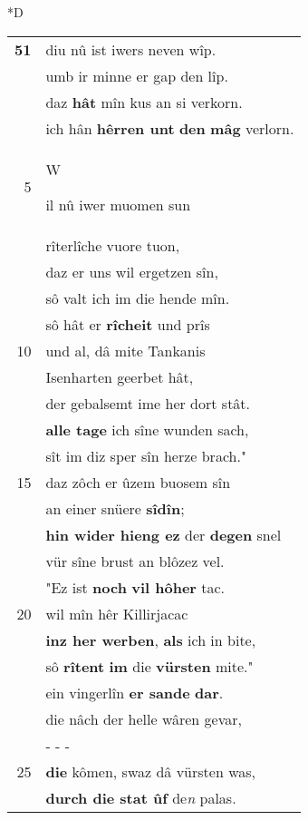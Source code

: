 \documentclass[8pt,a4paper,notitlepage]{article}
\begin{document}
\begin{table}[ht]
\begin{minipage}[t]{0.5\linewidth}
\small
\begin{center}*D
\end{center}
\begin{tabular}{rl}
\textbf{51} & diu nû ist iwers neven wîp.\\ 
 & umb ir minne er gap den lîp.\\ 
 & daz \textbf{hât} mîn kus an si verkorn.\\ 
 & ich hân \textbf{hêrren unt} \textbf{den} \textbf{mâg} verlorn.\\ 
5 & \begin{large}W\end{large}il nû iwer muomen sun\\ 
 & rîterlîche vuore tuon,\\ 
 & daz er uns wil ergetzen sîn,\\ 
 & sô valt ich im die hende mîn.\\ 
 & sô hât er \textbf{rîcheit} und prîs\\ 
10 & und al, dâ mite Tankanis\\ 
 & Isenharten geerbet hât,\\ 
 & der gebalsemt ime her dort stât.\\ 
 & \textbf{alle tage} ich sîne wunden sach,\\ 
 & sît im diz sper sîn herze brach."\\ 
15 & daz zôch er ûzem buosem sîn\\ 
 & an einer snüere \textbf{sîdîn};\\ 
 & \textbf{hin wider hieng ez} der \textbf{degen} snel\\ 
 & vür sîne brust an blôzez vel.\\ 
 & "Ez ist \textbf{noch} \textbf{vil hôher} tac.\\ 
20 & wil mîn hêr Killirjacac\\ 
 & \textbf{inz her werben}, \textbf{als} ich in bite,\\ 
 & sô \textbf{rîtent} \textbf{im} die \textbf{vürsten} mite."\\ 
 & ein vingerlîn \textbf{er sande} \textbf{dar}.\\ 
 & die nâch der helle wâren gevar,\\ 
 & \multicolumn{1}{l}{ - - - }\\ 
25 & \textbf{die} kômen, swaz dâ vürsten was,\\ 
 & \textbf{durch die stat ûf} de\textit{n} palas.\\ 

\end{tabular}
\end{minipage}
\end{table}
\end{document}
